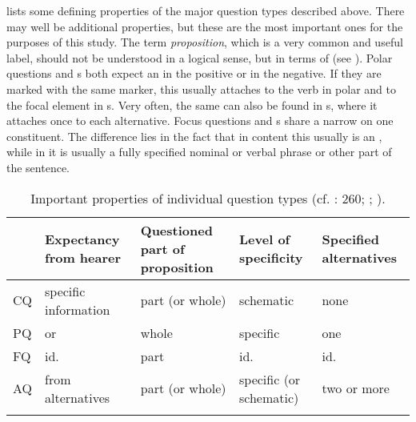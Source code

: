  lists some defining properties of the major question types described above. There may well be additional properties, but these are the most important ones for the purposes of this study. The term \textit{proposition}, which is a very common and useful label, should not be understood in a logical sense, but in terms of \textit{} (see ). Polar questions and s both expect an  in the positive or in the negative. If they are marked with the same marker, this usually attaches to the verb in polar  and to the focal element in s. Very often, the same  can also be found in s, where it attaches once to each alternative. Focus questions and s share a narrow  on one constituent. The difference lies in the fact that in content  this usually is an , while in   it is usually a fully specified nominal or verbal phrase or other part of the sentence.

\begin{table}
\caption{Important properties of individual question types (cf. \citealt{Dik1997}: 260; \citealt{Dixon2012}; \citealt{Hölzl2015e,Hölzl2016a}).}
\label{tab:4:2}

\begin{tabularx}{\textwidth}{lQQQQ}
\lsptoprule
& \textbf{Expectancy from hearer} & \textbf{Questioned part of proposition} & \textbf{Level of specificity} & \textbf{Specified alternatives}\\
\midrule
CQ & specific information & part (or whole) & schematic & none\\
PQ &  or  & whole & specific & one\\
FQ & id. & part & id. & id.\\
AQ &  from alternatives & part (or whole) & specific (or schematic) & two or more\\
\lspbottomrule
\end{tabularx}
\end{table}


